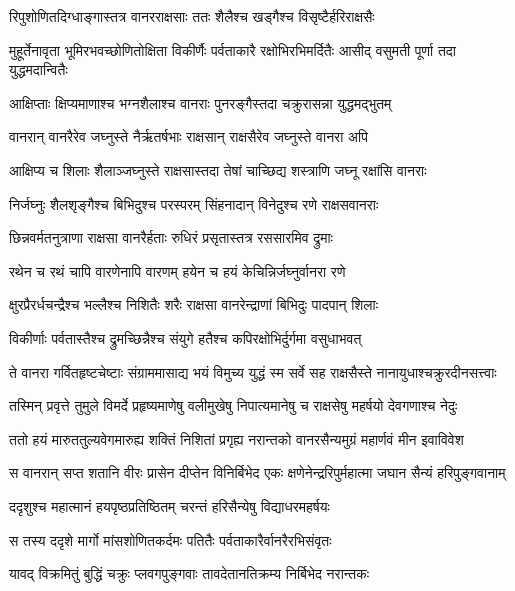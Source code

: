 \twolineshloka
{रिपुशोणितदिग्धाङ्गास्तत्र वानरराक्षसाः}
{ततः शैलैश्च खड्गैश्च विसृष्टैर्हरिराक्षसैः} %

\threelineshloka
{मुहूर्तेनावृता भूमिरभवच्छोणितोक्षिता}
{विकीर्णैः पर्वताकारै रक्षोभिरभिमर्दितैः}
{आसीद् वसुमती पूर्णा तदा युद्धमदान्वितैः} %

\twolineshloka
{आक्षिप्ताः क्षिप्यमाणाश्च भग्नशैलाश्च वानराः}
{पुनरङ्गैस्तदा चक्रुरासन्ना युद्धमद्भुतम्} %

\twolineshloka
{वानरान् वानरैरेव जघ्नुस्ते नैर्ऋतर्षभाः}
{राक्षसान् राक्षसैरेव जघ्नुस्ते वानरा अपि} %

\twolineshloka
{आक्षिप्य च शिलाः शैलाञ्जघ्नुस्ते राक्षसास्तदा}
{तेषां चाच्छिद्य शस्त्राणि जघ्नू रक्षांसि वानराः} %

\twolineshloka
{निर्जघ्नुः शैलशृङ्गैश्च बिभिदुश्च परस्परम्}
{सिंहनादान् विनेदुश्च रणे राक्षसवानराः} %

\twolineshloka
{छिन्नवर्मतनुत्राणा राक्षसा वानरैर्हताः}
{रुधिरं प्रसृतास्तत्र रससारमिव द्रुमाः} %

\twolineshloka
{रथेन च रथं चापि वारणेनापि वारणम्}
{हयेन च हयं केचिन्निर्जघ्नुर्वानरा रणे} %

\twolineshloka
{क्षुरप्रैरर्धचन्द्रैश्च भल्लैश्च निशितैः शरैः}
{राक्षसा वानरेन्द्राणां बिभिदुः पादपान् शिलाः} %

\twolineshloka
{विकीर्णाः पर्वतास्तैश्च द्रुमच्छिन्नैश्च संयुगे}
{हतैश्च कपिरक्षोभिर्दुर्गमा वसुधाभवत्} %

\twolineshloka
{ते वानरा गर्वितहृष्टचेष्टाः संग्राममासाद्य भयं विमुच्य}
{युद्धं स्म सर्वे सह राक्षसैस्ते नानायुधाश्चक्रुरदीनसत्त्वाः} %

\twolineshloka
{तस्मिन् प्रवृत्ते तुमुले विमर्दे प्रहृष्यमाणेषु वलीमुखेषु}
{निपात्यमानेषु च राक्षसेषु महर्षयो देवगणाश्च नेदुः} %

\twolineshloka
{ततो हयं मारुततुल्यवेगमारुह्य शक्तिं निशितां प्रगृह्य}
{नरान्तको वानरसैन्यमुग्रं महार्णवं मीन इवाविवेश} %

\twolineshloka
{स वानरान् सप्त शतानि वीरः प्रासेन दीप्तेन विनिर्बिभेद}
{एकः क्षणेनेन्द्ररिपुर्महात्मा जघान सैन्यं हरिपुङ्गवानाम्} %

\twolineshloka
{ददृशुश्च महात्मानं हयपृष्ठप्रतिष्ठितम्}
{चरन्तं हरिसैन्येषु विद्याधरमहर्षयः} %

\twolineshloka
{स तस्य ददृशे मार्गो मांसशोणितकर्दमः}
{पतितैः पर्वताकारैर्वानरैरभिसंवृतः} %

\twolineshloka
{यावद् विक्रमितुं बुद्धिं चक्रुः प्लवगपुङ्गवाः}
{तावदेतानतिक्रम्य निर्बिभेद नरान्तकः} %

